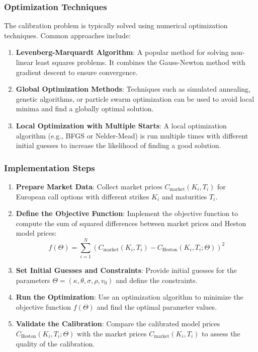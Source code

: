 \documentclass[11pt, oneside, a4paper, titlepage]{report}
\begin{document}
\subsubsection{Optimization Techniques}

The calibration problem is typically solved using numerical optimization techniques. Common approaches include:
\begin{enumerate}
    \item \textbf{Levenberg-Marquardt Algorithm}:
    A popular method for solving non-linear least squares problems. It combines the Gauss-Newton method with gradient descent to ensure convergence.
    \item \textbf{Global Optimization Methods}:
    Techniques such as simulated annealing, genetic algorithms, or particle swarm optimization can be used to avoid local minima and find a globally optimal solution.
    \item \textbf{Local Optimization with Multiple Starts}:
    A local optimization algorithm (e.g., BFGS or Nelder-Mead) is run multiple times with different initial guesses to increase the likelihood of finding a good solution.
\end{enumerate}

\subsubsection{Implementation Steps}

\begin{enumerate}
    \item \textbf{Prepare Market Data}:
    Collect market prices \( C_{\text{market}}(K_i, T_i) \) for European call options with different strikes \( K_i \) and maturities \( T_i \).
    \item \textbf{Define the Objective Function}:
    Implement the objective function to compute the sum of squared differences between market prices and Heston model prices:
    \[
    f(\Theta) = \sum_{i=1}^N \left( C_{\text{market}}(K_i, T_i) - C_{\text{Heston}}(K_i, T_i; \Theta) \right)^2
    \]
    \item \textbf{Set Initial Guesses and Constraints}:
    Provide initial guesses for the parameters \( \Theta = (\kappa, \theta, \sigma, \rho, v_0) \) and define the constraints.
    \item \textbf{Run the Optimization}:
    Use an optimization algorithm to minimize the objective function \( f(\Theta) \) and find the optimal parameter values.
    \item \textbf{Validate the Calibration}:
    Compare the calibrated model prices \( C_{\text{Heston}}(K_i, T_i; \Theta) \) with the market prices \( C_{\text{market}}(K_i, T_i) \) to assess the quality of the calibration.
\end{enumerate}
\end{document}
